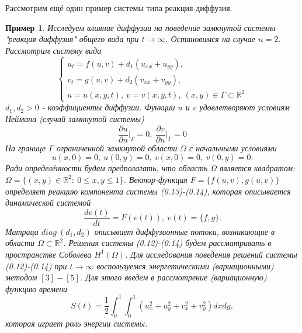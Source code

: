 \documentclass[9pt, a4paper]{extarticle}
\newtheorem{sample}{Пример}
\numberwithin{equation}{section}
\numberwithin{lemma}{section}
\numberwithin{definition}{section}
\numberwithin{notabene}{section}
\numberwithin{corollary}{section}
\begin{document}
	Рассмотрим ещё один пример системы типа реакция-диффузия.
	\begin{sample}
		Исследуем влияние диффузии на поведение замкнутой системы "реакция-диффузия" общего вида при $t \to \infty$. Остановимся на случае $n=2$. Рассмотрим систему вида
		\begin{equation}
			\begin{cases}
				u_t = f(u,v) + d_1 (u_{xx} + u_{yy}), \\
				v_t = g(u,v) + d_2(v_{xx} + v_{yy}), \\
				u = u(x,y,t), \ v = v(x,y,t), \ (x,y) \in \Gamma \subset \mathbb{R}^2
			\end{cases}
		\end{equation}
		$d_1, d_2 > 0$ - коэффициенты диффузии. \newline
		Функции $u$ и $v$ удовлетворяют условиям Неймана (случай замкнутой системы)
		\begin{equation}
			\dfrac{\partial u}{\partial n}\vert_{\Gamma} = 0, \ \dfrac{\partial v}{\partial n}\vert_{\Gamma} = 0
		\end{equation}
		На границе $\Gamma$ ограниченной замкнутой области $\Omega$ с начальными условиями
		\begin{equation}
			u(x,0) = 0, \ u(0,y) = 0, \ v(x,0) = 0, \ v(0,y) = 0.
		\end{equation}
		Ради определённости будем предполагать, что область $\Omega$ является квадратом: $\Omega = \{(x,y) \in \mathbb{R}^2 : \ 0 \leq x,y \leq 1\}$.\newline
		Вектор-функция $F = \{f(u,v), g(u,v)\}$ определяет реакцию компонента системы (0.13)-(0.14), которая описывается динамической системой
		\begin{equation*}
			\dfrac{dv(t)}{dt} = F(v(t)), \ v(t) = \{f,g\}.
		\end{equation*}
		Матрица $diag\ (d_1, d_2)$ описывает диффузионные потоки, возникающие в области $\Omega \subset \mathbb{R}^2$. Решения системы (0.12)-(0.14) будем рассматривать в пространстве Соболева $H^1(\Omega)$.\newline
		Для исследования поведения решений системы (0.12)-(0.14) при $t \to \infty$ воспользуемся энергетическими (вариационными) методом $[3]-[5]$. Для этого введем в рассмотрение (вариационную) функцию времени
		\begin{equation}
			S(t) = \dfrac12 \int_0^1 \int_0^1 \left(u_x^2 + u_y^2 + v_x^2 + v_y^2\right) dx dy, 
		\end{equation}
		которая играет роль энергии системы.\newline

\end{sample}
\end{document}
